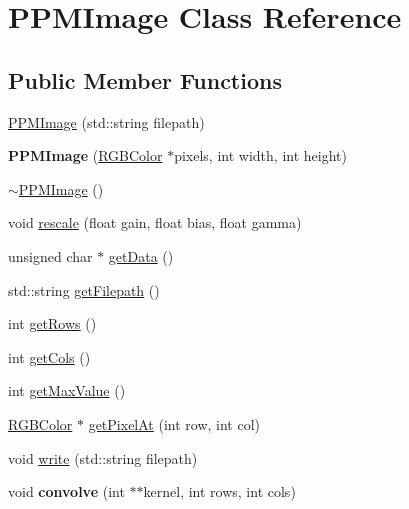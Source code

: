 \hypertarget{classPPMImage}{}\section{P\+P\+M\+Image Class Reference}
\label{classPPMImage}
\subsection*{Public Member Functions}
\begin{DoxyCompactItemize}
\item 
\hyperlink{classPPMImage_a0115b29f89aa37df9c2b464602975db4}{P\+P\+M\+Image} (std\+::string filepath)
\item 
\mbox{\label{classPPMImage_a8a9fbafde497d709846a44dfa4f9f7a7}} 
{\bfseries P\+P\+M\+Image} (\hyperlink{classRGBColor}{R\+G\+B\+Color} $\ast$pixels, int width, int height)
\item 
\hyperlink{classPPMImage_a5e7deaacad136e95057381bb0b30e25a}{$\sim$\+P\+P\+M\+Image} ()
\item 
void \hyperlink{classPPMImage_a1d31bcbff990b8ddaca75acaed900711}{rescale} (float gain, float bias, float gamma)
\item 
unsigned char $\ast$ \hyperlink{classPPMImage_a6251e11a3e63d587526c04a4d67018a8}{get\+Data} ()
\item 
std\+::string \hyperlink{classPPMImage_ac1c531367f7b41d60e527d10f77f7536}{get\+Filepath} ()
\item 
int \hyperlink{classPPMImage_ac764135f24d3cb73ad364216f91f80d6}{get\+Rows} ()
\item 
int \hyperlink{classPPMImage_a3c6700065f9512bbc03873f0400fca4a}{get\+Cols} ()
\item 
int \hyperlink{classPPMImage_aa4fc6f6e7eb6fc7304c214b75b8eb80e}{get\+Max\+Value} ()
\item 
\hyperlink{classRGBColor}{R\+G\+B\+Color} $\ast$ \hyperlink{classPPMImage_a812aa553ba32c6ebf901807fda170f1d}{get\+Pixel\+At} (int row, int col)
\item 
void \hyperlink{classPPMImage_ae2f29baea2f93059c83160bb80f2af4c}{write} (std\+::string filepath)
\item 
\mbox{\label{classPPMImage_ae42d5bee0da02e937036ce7295221de0}} 
void {\bfseries convolve} (int $\ast$$\ast$kernel, int rows, int cols)
\end{DoxyCompactItemize}


